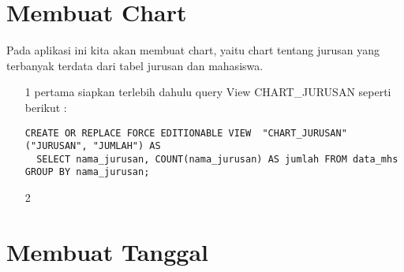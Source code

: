 \section{Membuat Chart}
Pada aplikasi ini kita akan membuat chart, yaitu chart tentang jurusan yang terbanyak terdata dari tabel jurusan dan mahasiswa.
\begin{itemize}
    \item[1] pertama siapkan terlebih dahulu query View CHART\_JURUSAN seperti berikut :
        \begin{lstlisting}
CREATE OR REPLACE FORCE EDITIONABLE VIEW  "CHART_JURUSAN" ("JURUSAN", "JUMLAH") AS 
  SELECT nama_jurusan, COUNT(nama_jurusan) AS jumlah FROM data_mhs GROUP BY nama_jurusan;        
        \end{lstlisting}
    \item[2] 
\end{itemize}

\section{Membuat Tanggal}